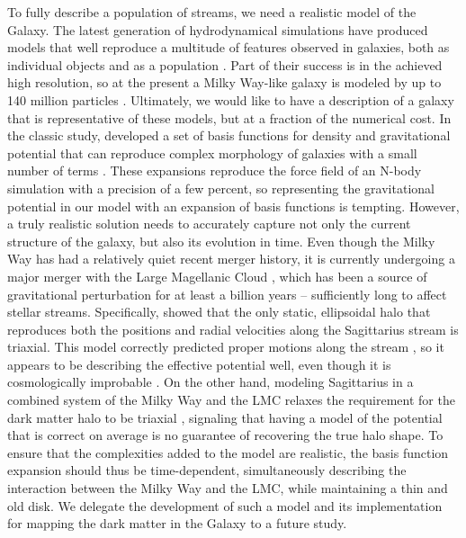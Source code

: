 \documentclass[modern]{aastex62}
\begin{document}
To fully describe a population of streams, we need a realistic model of the Galaxy.
The latest generation of hydrodynamical simulations have produced models that well reproduce a multitude of features observed in galaxies, both as individual objects \citep[e.g.,][]{wetzel2016} and as a population \citep[e.g.,][]{pillepich2018,nelson2018}.
Part of their success is in the achieved high resolution, so at the present a Milky Way-like galaxy is modeled by up to 140 million particles \citep{wetzel2016}.
Ultimately, we would like to have a description of a galaxy that is representative of these models, but at a fraction of the numerical cost.
In the classic study, \citet{ho} developed a set of basis functions for density and gravitational potential that can reproduce complex morphology of galaxies with a small number of terms \citep[e.g.,][]{lowing2011, lilley2018a, lilley2018b}.
These expansions reproduce the force field of an N-body simulation with a precision of a few percent, so representing the gravitational potential in our model with an expansion of basis functions is tempting.
However, a truly realistic solution needs to accurately capture not only the current structure of the galaxy, but also its evolution in time.
Even though the Milky Way has had a relatively quiet recent merger history, it is currently undergoing a major merger with the Large Magellanic Cloud \citep[e.g.,][]{besla2007, penarrubia2016}, which has been a source of gravitational perturbation for at least a billion years -- sufficiently long to affect stellar streams.
Specifically, \citet{lm10} showed that the only static, ellipsoidal halo that reproduces both the positions and radial velocities along the Sagittarius stream is triaxial.
This model correctly predicted proper motions along the stream \citep{sohn2015}, so it appears to be describing the effective potential well, even though it is cosmologically improbable \citep{debattista2013}.
On the other hand, modeling Sagittarius in a combined system of the Milky Way and the LMC relaxes the requirement for the dark matter halo to be triaxial \citep{vch2013}, signaling that having a model of the potential that is correct on average is no guarantee of recovering the true halo shape.
To ensure that the complexities added to the model are realistic, the basis function expansion should thus be time-dependent, simultaneously describing the interaction between the Milky Way and the LMC, while maintaining a thin and old disk. 
We delegate the development of such a model and its implementation for mapping the dark matter in the Galaxy to a future study.
\end{document}
